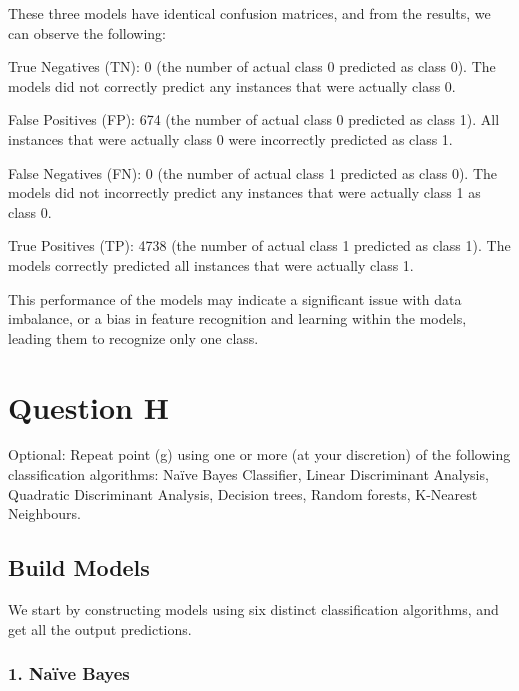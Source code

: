 \documentclass[
]{article}
\begin{document}
These three models have identical confusion matrices, and from the
results, we can observe the following:

True Negatives (TN): 0 (the number of actual class 0 predicted as class
0). The models did not correctly predict any instances that were
actually class 0.

False Positives (FP): 674 (the number of actual class 0 predicted as
class 1). All instances that were actually class 0 were incorrectly
predicted as class 1.

False Negatives (FN): 0 (the number of actual class 1 predicted as class
0). The models did not incorrectly predict any instances that were
actually class 1 as class 0.

True Positives (TP): 4738 (the number of actual class 1 predicted as
class 1). The models correctly predicted all instances that were
actually class 1.

This performance of the models may indicate a significant issue with
data imbalance, or a bias in feature recognition and learning within the
models, leading them to recognize only one class.

\hypertarget{question-h}{%
\section{Question H}\label{question-h}}

Optional: Repeat point (g) using one or more (at your discretion) of the
following classification algorithms: Naïve Bayes Classifier, Linear
Discriminant Analysis, Quadratic Discriminant Analysis, Decision trees,
Random forests, K-Nearest Neighbours.

\hypertarget{build-models}{%
\subsection{Build Models}\label{build-models}}

We start by constructing models using six distinct classification
algorithms, and get all the output predictions.

\hypertarget{nauxefve-bayes}{%
\subsubsection{1. Naïve Bayes}\label{nauxefve-bayes}}
\end{document}
